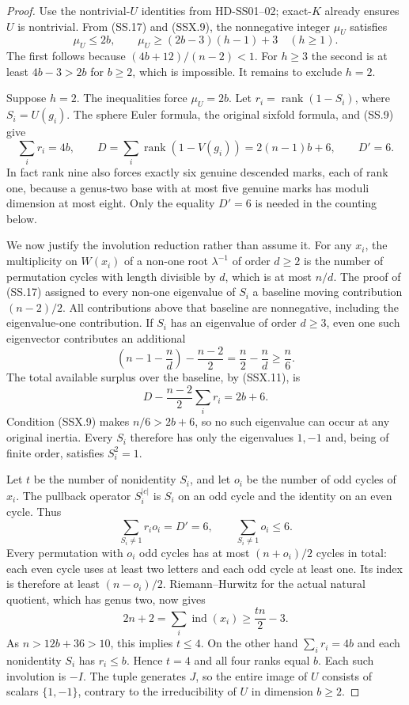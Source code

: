 \begin{proof}
Use the nontrivial-$U$ identities from HD-SS01--02; exact-$K$
already ensures $U$ is nontrivial.  From (SS.17) and (SSX.9),
the nonnegative integer $\mu_U$ satisfies
\[
              \mu_U\le2b,
 \qquad
              \mu_U\ge(2b-3)(h-1)+3\quad(h\ge1).
 \tag{SSX.10}
\]
The first follows because $(4b+12)/(n-2)<1$.
For $h\ge3$ the second is at least $4b-3>2b$ for $b\ge2$,
which is impossible.  It remains to exclude $h=2$.

Suppose $h=2$.  The inequalities force $\mu_U=2b$.
Let $r_i=\operatorname{rank}(1-S_i)$, where $S_i=U(g_i)$.
The sphere Euler formula, the original sixfold formula,
and (SS.9) give
\[
 \sum_i r_i=4b,\qquad
 D=\sum_i\operatorname{rank}(1-V(g_i))=2(n-1)b+6,
 \qquad D'=6.
 \tag{SSX.11}
\]
In fact rank nine also forces exactly six genuine descended
marks, each of rank one, because a genus-two base with at most
five genuine marks has moduli dimension at most eight.
Only the equality $D'=6$ is needed in the counting below.

We now justify the involution reduction rather than assume it.
For any $x_i$, the multiplicity on $W(x_i)$ of a non-one root
$\lambda^{-1}$ of order $d\ge2$ is the number of permutation
cycles with length divisible by $d$, which is at most $n/d$.
The proof of (SS.17) assigned to every non-one eigenvalue of
$S_i$ a baseline moving contribution $(n-2)/2$.
All contributions above that baseline are nonnegative, including
the eigenvalue-one contribution.  If $S_i$ has an eigenvalue of
order $d\ge3$, even one such eigenvector contributes an additional
\[
 \left(n-1-\frac nd\right)-\frac{n-2}{2}
                       =\frac n2-\frac nd\ge\frac n6.
 \tag{SSX.12}
\]
The total available surplus over the baseline, by (SSX.11), is
\[
           D-\frac{n-2}{2}\sum_i r_i=2b+6.
 \tag{SSX.13}
\]
Condition (SSX.9) makes $n/6>2b+6$, so no such eigenvalue can
occur at any original inertia.  Every $S_i$ therefore has only
the eigenvalues $1,-1$ and, being of finite order, satisfies
$S_i^2=1$.

Let $t$ be the number of nonidentity $S_i$, and let $o_i$ be
the number of odd cycles of $x_i$.  The pullback operator
$S_i^{|c|}$ is $S_i$ on an odd cycle and the identity on an
even cycle.  Thus
\[
              \sum_{S_i\ne1}r_i o_i=D'=6,
 \qquad
              \sum_{S_i\ne1}o_i\le6.
 \tag{SSX.14}
\]
Every permutation with $o_i$ odd cycles has at most
$(n+o_i)/2$ cycles in total: each even cycle uses at least two
letters and each odd cycle at least one.  Its index is therefore
at least $(n-o_i)/2$.  Riemann--Hurwitz for the actual natural
quotient, which has genus two, now gives
\[
       2n+2=\sum_i\operatorname{ind}(x_i)
          \ge\frac{tn}{2}-3.
 \tag{SSX.15}
\]
As $n>12b+36>10$, this implies $t\le4$.
On the other hand $\sum_i r_i=4b$ and each nonidentity $S_i$
has $r_i\le b$.  Hence $t=4$ and all four ranks equal $b$.
Each such involution is $-I$.  The tuple generates $J$, so the
entire image of $U$ consists of scalars $\{1,-1\}$, contrary
to the irreducibility of $U$ in dimension $b\ge2$.


\end{proof}
